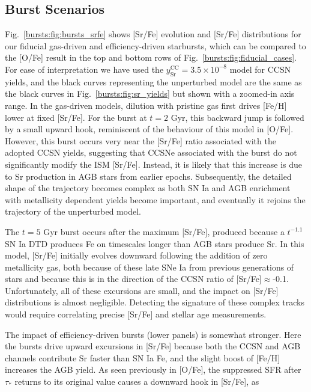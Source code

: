\subsection{Burst Scenarios}

Fig.~\ref{bursts:fig:bursts_srfe} shows [Sr/Fe] evolution and [Sr/Fe] distributions 
for our fiducial gas-driven and efficiency-driven starbursts, which can be 
compared to the [O/Fe] result in the top and bottom rows of 
Fig.~\ref{bursts:fig:fiducial_cases}. For ease of interpretation we have used the 
$y_\text{Sr}^\text{CC} = 3.5\times10^{-8}$ model for CCSN yields, and the 
black curves representing the unperturbed model are the same as the black 
curves in Fig.~\ref{bursts:fig:sr_yields} but shown with a zoomed-in axis range. 
In the gas-driven models, dilution with pristine gas first drives [Fe/H] lower 
at fixed [Sr/Fe]. For the burst at $t = 2$ Gyr, this backward jump is followed 
by a small upward hook, reminiscent of the behaviour of this model in [O/Fe]. 
However, this burst occurs very near the [Sr/Fe] ratio associated with the 
adopted CCSN yields, suggesting that CCSNe associated with the burst do not 
significantly modify the ISM [Sr/Fe]. Instead, it is likely that this increase 
is due to Sr production in AGB stars from earlier epochs. Subsequently, the 
detailed shape of the trajectory becomes complex as both SN Ia and AGB 
enrichment with metallicity dependent yields become important, and eventually 
it rejoins the trajectory of the unperturbed model. 
\par 
The $t = 5$ Gyr burst occurs after the maximum [Sr/Fe], produced because a 
$t^{-1.1}$ SN Ia DTD produces Fe on timescales longer than AGB stars produce 
Sr. In this model, [Sr/Fe] initially evolves downward following the addition 
of zero metallicity gas, both because of these late SNe Ia from previous 
generations of stars and because this is in the direction of the CCSN ratio of 
[Sr/Fe]$\approx$-0.1. Unfortunately, all of these excursions are small, and 
the impact on [Sr/Fe] distributions is almost negligible. Detecting the 
signature of these complex tracks would require correlating precise [Sr/Fe] 
and stellar age measurements. 
\par 
The impact of efficiency-driven bursts (lower panels) is somewhat stronger. 
Here the bursts drive upward excursions in [Sr/Fe] because both the CCSN and 
AGB channels contribute Sr faster than SN Ia Fe, and the slight boost of [Fe/H] 
increases the AGB yield. As seen previously in [O/Fe], the suppressed SFR after 
$\tau_*$ returns to its original value causes a downward hook in [Sr/Fe], as 
